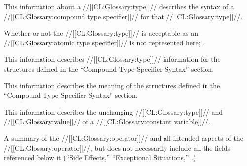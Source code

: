 \endsubsubsubsection%


This information about a //[[CL:Glossary:type]]// describes the syntax of a 
//[[CL:Glossary:compound type specifier]]// for that //[[CL:Glossary:type]]//.

Whether or not the //[[CL:Glossary:type]]// is acceptable as an //[[CL:Glossary:atomic type specifier]]//
is not represented here; \seesection\TypeSpecEntries.

\endsubsubsubsection%


This information describes //[[CL:Glossary:type]]// information for the structures defined in
the ``Compound Type Specifier Syntax'' section.

\endsubsubsubsection%


This information describes the meaning of the structures defined in
the ``Compound Type Specifier Syntax'' section.

\endsubsubsubsection%

\endsubsubsection%


This information describes the unchanging //[[CL:Glossary:type]]// and //[[CL:Glossary:value]]// of 
a //[[CL:Glossary:constant variable]]//.

\endsubsubsection%


A summary of the //[[CL:Glossary:operator]]// and all intended aspects of the //[[CL:Glossary:operator]]//, 
but does not necessarily include all the fields referenced below it 
(``Side Effects,'' ``Exceptional Situations,'' \etc.)

\endsubsubsection%

